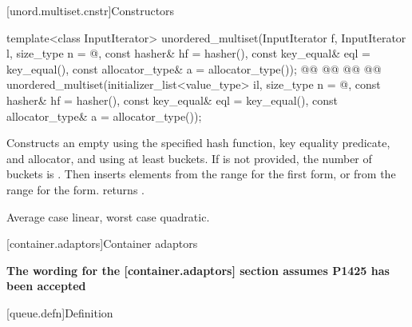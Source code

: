 \documentclass{wg21}
\begin{document}
[unord.multiset.cnstr]{Constructors}


%
\begin{itemdecl}
template<class InputIterator>
unordered_multiset(InputIterator f, InputIterator l,
    size_type n = @\seebelow@,
    const hasher& hf = hasher(),
    const key_equal& eql = key_equal(),
    const allocator_type& a = allocator_type());
@@
@@
    @@
    @@
unordered_multiset(initializer_list<value_type> il,
    size_type n = @\seebelow@,
    const hasher& hf = hasher(),
    const key_equal& eql = key_equal(),
    const allocator_type& a = allocator_type());
\end{itemdecl}

\begin{itemdescr}
    \pnum
    \effects
    Constructs an empty  using the
    specified hash function, key equality predicate, and allocator, and
    using at least  buckets. If  is not
    provided, the number of buckets is . Then
    inserts elements from the range 
    for the first form,  or from the range
     for the  form.
     returns .

    \pnum
    \complexity
    Average case linear, worst case quadratic.
\end{itemdescr}

[container.adaptors]{Container adaptors}

\textbf{The wording for the [container.adaptors] section assumes P1425 has been accepted}

[queue.defn]{Definition}
\end{document}
